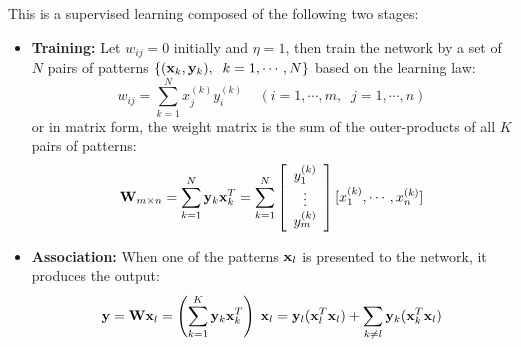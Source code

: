 \documentclass{article}
\begin{document}
This is a supervised learning composed of the following two stages:
\begin{itemize}
\item {\bf Training:} Let $w_{ij}=0$ initially and $\eta=1$, then train
  the network by a set of $N$ pairs of patterns $\{ ({\bf x}_k,{\bf y}_k),\;\;
  k=1,\cdots,N\}$ based on the learning law:
  \begin{equation}
  w_{ij}=\sum_{k=1}^Nx_j^{(k)}y_i^{(k)}\;\;\;\;(i=1,\cdots,m,\;\;j=1,\cdots,n)
  \end{equation}
  or in matrix form, the weight matrix is the sum of the outer-products of all
  $K$ pairs of patterns:
  \begin{equation}
    {\bf W}_{m\times n}=\sum_{k=1}^N {\bf y}_k {\bf x}_k^T = \sum_{k=1}^N 
    \left[ \begin{array}{c} y_1^{(k)} \\ \vdots \\ y_m^{(k)} \end{array} \right]
         [ x_1^{(k)}, \cdots, x_n^{(k)} ]	
  \end{equation}
\item {\bf Association:} When one of the patterns ${\bf x}_l$ is presented
  to the network, it produces the output:
  \begin{equation}
    {\bf y}={\bf W}{\bf x}_l=\left(\sum_{k=1}^K {\bf y}_k {\bf x}_k^T\right)\;{\bf x}_l
    ={\bf y}_l({\bf x}_l^T{\bf x}_l)+\sum_{k\neq l}{\bf y}_k({\bf x}_k^T{\bf x}_l)
  \end{equation}
\end{itemize}
\end{document}
